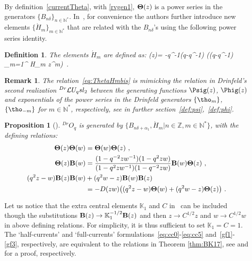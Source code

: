 \documentclass[11pt]{amsart}
\numberwithin{equation}{section}
\newtheorem{prop}[thm]{Proposition}
\newtheorem{defn}[thm]{Definition}
\newtheorem{rem}[thm]{Remark}
\numberwithin{equation}{section}
\begin{document}
By definition~\eqref{currentTheta}, with \eqref{rvgen1}, ${\bf \Theta}(z)$ is a power series in the generators $\{B_{n\delta}\}_{n\in{\mathbb N}^*}$. In~\cite{LW20}, for convenience the authors further introduce new elements $\{{\acute H}_m\}_{m\in{\mathbb N}^*}$ that are related with the $B_{n\delta}$'s using the following power series identity.
\begin{defn}\label{def:Hacute} The elements ${\acute H}_m$  are defined as: 
\beqa
{\bf \Theta} (z)= -q^{-1}(q-q^{-1})   \exp\left((q-q^{-1}) \sum_{m=1}^{\infty} {\acute H}_m z^m\right)\ .\label{eq:ThetaHmbis}
\eeqa
\end{defn}
\begin{rem}
The relation~\eqref{eq:ThetaHmbis} is mimicking the relation in Drinfeld's second realization $^{Dr}\mathcal{L} U_q sl_2$ between the generating functions $\Psig(z)$, $\Phig(z)$ and exponentials of the power series in the Drinfeld generators $\{\tho_m\}$, $\{\tho_{-m}\}$ for $m\in{\mathbb N}^*$, respectively, see in further section~\eqref{def:psi},~\eqref{def:phi}.
\end{rem}
\begin{prop}[\cite{LW20}]\label{prop:DrOq}  $^{Dr}O_q$ is generated by $\{B_{n\delta + \alpha_1},{\acute H}_m|n \in {\mathbb Z},m\in {\mathbb N}^*\}$,  with the defining relations:
\begin{align}
	{\bf \Theta} (z)  {\bf \Theta}(w)
	&= {\bf \Theta} (w)  {\bf \Theta}(z)\ ,
	\label{gf1} \\
	{\bf \Theta} (z)  {\bf B}(w)
	& =  \frac{(1 -q^{-2}zw^{-1}) (1 -q^{2} zw)}{(1 -q^{2}zw^{-1})(1 -q^{-2}zw)}
	{\bf B}(w) {\bf \Theta} (z)\ ,
	\\
	(q^2z-w) {\bf B}(z) {\bf B}(w) & +(q^{2}w-z) {\bf B}(w) {\bf B}(z)
	\label{gf3} \\
	& = - D(zw) \big( (q^2z-w){\bf \Theta}(w) +(q^2w-z){\bf \Theta}(z) \big)\ .\notag
\end{align}
\end{prop}

Let us notice that the extra central elements ${\mathbb K}_1$ and $C$ in~\cite[Eqs.\,(1.1)-(1.3)]{LW20} can be included though the substitutions $\bold B(z)\rightarrow{\mathbb K}_1^{-1/2}\bold B(z)$  and then  $z\rightarrow C^{1/2}z$ and $w\rightarrow C^{1/2}w$ in above defining relations. For simplicity, it is thus sufficient to set ${\mathbb K}_1=C=1$.
The `half-currents' and `full-currents' formulations~\eqref{eq:cc0}-\eqref{eq:cc5} and~\eqref{gf1}-\eqref{gf3}, respectively,  are equivalent to the relations in Theorem \ref{thm:BK17}, see \cite[Section 5]{Ter21b} and \cite[Section 2.2]{LW20} for a proof, respectively.
\end{document}
